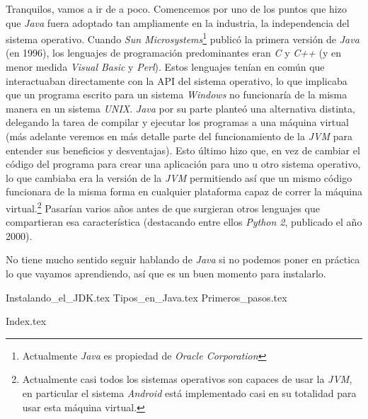     Tranquilos, vamos a ir de a poco.
    Comencemos por uno de los puntos que hizo que \textit{Java} fuera adoptado tan ampliamente en la
    industria, la independencia del sistema operativo.
    Cuando \textit{Sun Microsystems}\footnote{Actualmente \textit{Java} es propiedad de 
    \textit{Oracle Corporation}} publicó la primera versión de \textit{Java} (en 1996), los 
    lenguajes de programación predominantes eran \textit{C} y \textit{C++} (y en menor medida 
    \textit{Visual Basic} y \textit{Perl}).
    Estos lenguajes tenían en común que interactuaban directamente con la API del sistema operativo,
    lo que implicaba que un programa escrito para un sistema \textit{Windows} no funcionaría de la
    misma manera en un sistema \textit{UNIX}.
    \textit{Java} por su parte planteó una alternativa distinta, delegando la tarea de compilar y 
    ejecutar los programas a una máquina virtual (más adelante veremos en más detalle parte del 
    funcionamiento de la \textit{JVM} para entender sus beneficios y desventajas).
    Esto último hizo que, en vez de cambiar el código del programa para crear una aplicación para 
    uno u otro sistema operativo, lo que cambiaba era la versión de la \textit{JVM} permitiendo así
    que un mismo código funcionara de la misma forma en cualquier plataforma capaz de correr la 
    máquina virtual.\footnote{Actualmente casi todos los sistemas operativos son capaces de usar la 
    \textit{JVM}, en particular el sistema \textit{Android} está implementado casi en su totalidad 
    para usar esta máquina virtual.}
    Pasarían varios años antes de que surgieran otros lenguajes que compartieran esa característica
    (destacando entre ellos \textit{Python 2}, publicado el año 2000).

    No tiene mucho sentido seguir hablando de \textit{Java} si no podemos poner en práctica lo que 
    vayamos aprendiendo, así que es un buen momento para instalarlo.
    
    {Instalando_el_JDK.tex}
    {Tipos_en_Java.tex}
    {Primeros_pasos.tex}
  
  \printbibliography[keyword=Por_algo_se_empieza]
  
  {Index.tex}
  
